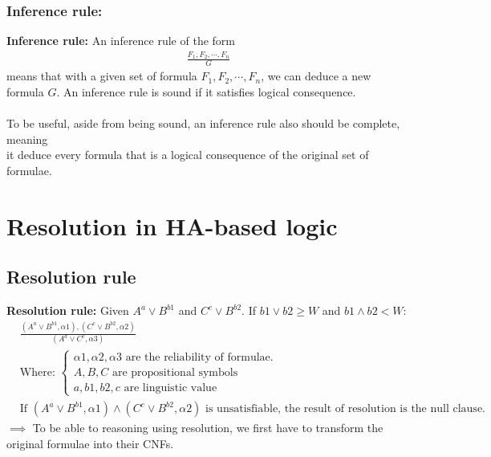 \documentclass[26pt,fleqn,]{article}
\begin{document}
\subsubsection{Inference rule:}
{\bfseries Inference rule:} An inference rule of the form\\
\begin{align*}
	\frac{F_1, F_2,\cdots,F_n}{G}
\end{align*}
means that with a given set of formula \(F_1,F_2,\cdots,F_n\), we can deduce a 
new formula \(G\). An inference rule is sound if it satisfies logical consequence.\\\\
To be useful, aside from being sound, an inference rule also should be complete, meaning\\
it deduce every formula that is a logical consequence of the original set of formulae.\\

%
%
\section{Resolution in HA-based logic}
\subsection{Resolution rule}
{\bfseries Resolution rule:} Given \(A^a \vee B^{b1}\) and \(C^c \vee B^{b2}\). If \(b1 \vee b2 
\ge W\) and \(b1 \wedge b2 < W\):
\begin{align*}
	&\frac{(A^a \vee B^{b1}, {\alpha 1}), (C^c \vee B^{b2}, {\alpha 2})} {(A^a \vee C^c, {\alpha 3})}\\
	&\text{Where: }
	\begin{cases}
	\alpha 1, \alpha 2, \alpha 3 \text{ are the reliability of formulae.}\\
	A, B, C \text{ are propositional symbols}\\
	a, b1, b2, c \text{ are linguistic value}
	\end{cases}
	\\
	&\text{If } (A^a \vee B^{b1}, {\alpha 1}) \wedge (C^c \vee B^{b2}, {\alpha 2}) \text{ is 
	unsatisfiable, the result of resolution is the null clause.} 
\end{align*}
\(\implies\) To be able to reasoning using resolution, we first have to transform the original
formulae into their CNFs.\\
\end{document}
